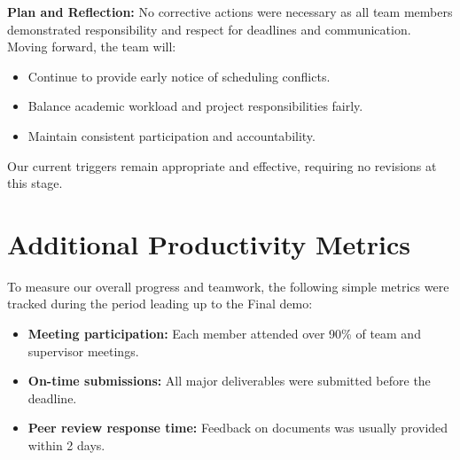 \documentclass{article}
\begin{document}
\vspace{0.5em}
\noindent\textbf{Plan and Reflection:} No corrective actions were necessary as all
team members demonstrated responsibility and respect for deadlines and
communication. Moving forward, the team will:
\begin{itemize}
  \item Continue to provide early notice of scheduling conflicts.
  \item Balance academic workload and project responsibilities fairly.
  \item Maintain consistent participation and accountability.
\end{itemize}

Our current triggers remain appropriate and effective, requiring no revisions
at this stage.

\section{Additional Productivity Metrics}

To measure our overall progress and teamwork, the following simple
metrics were tracked during the period leading up to the Final demo:

\begin{itemize}
  \item \textbf{Meeting participation:} Each member attended over 90\%
        of team and supervisor meetings.
  \item \textbf{On-time submissions:} All major deliverables were submitted 
        before the deadline.
  \item \textbf{Peer review response time:} Feedback on documents was
        usually provided within 2 days.
\end{itemize}
\end{document}
